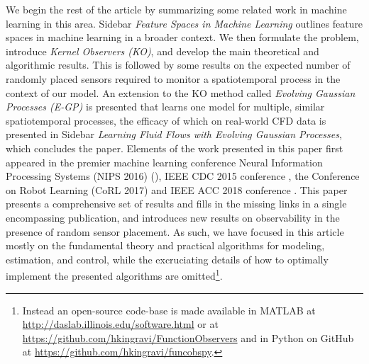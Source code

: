  We begin the rest of the article by summarizing some related work in machine learning in this area. Sidebar \emph{Feature Spaces in Machine Learning} outlines feature spaces in machine learning in a broader context. We then formulate the problem, introduce \emph{Kernel Observers (KO)}, and develop the main theoretical and algorithmic results.
This is followed by some results on the expected number of randomly placed sensors required to monitor a spatiotemporal process in the context of our model. An extension to the KO method called \emph{Evolving Gaussian Processes (E-GP)} is presented that learns one model for multiple, similar spatiotemporal processes, the efficacy of which on real-world CFD data is presented in Sidebar \emph{Learning Fluid Flows with Evolving Gaussian Processes}, which concludes the paper. 
Elements of the work presented in this paper first appeared in the premier machine learning conference Neural Information Processing Systems (NIPS 2016) (\cite{Kingravi16_NIPS,whitman2016NIPSworkshop}), IEEE CDC 2015 conference \cite{Kingravi:2015a}, the Conference on Robot Learning (CoRL 2017) \cite{whitman2017learning} and IEEE ACC 2018 conference \cite{Maske18_ACC}.  This paper presents a comprehensive set of results and fills in the missing links in a single encompassing publication, and introduces new results on observability in the presence of random sensor placement. As such, we have focused in this article mostly on the fundamental theory and practical algorithms for modeling, estimation, and control, while the excruciating details of how to optimally implement the presented algorithms are omitted\footnote{Instead an open-source code-base is made available in MATLAB at \url{http://daslab.illinois.edu/software.html} or at \url{https://github.com/hkingravi/FunctionObservers} and in Python on GitHub at \url{https://github.com/hkingravi/funcobspy}.}. 

